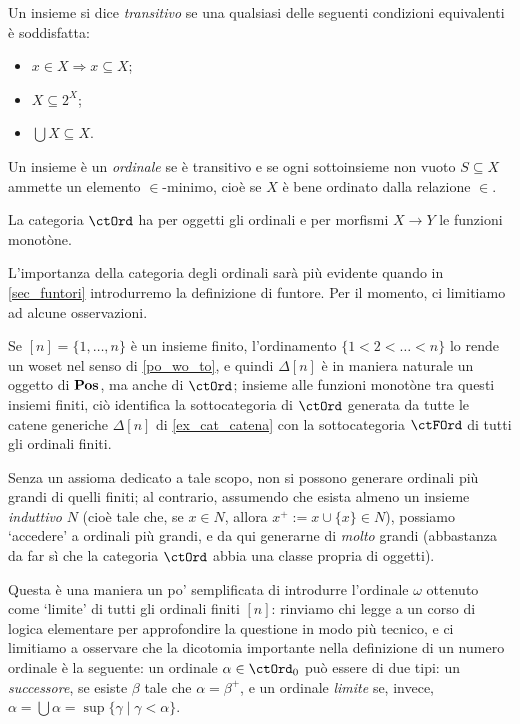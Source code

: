 \begin{example}\label{ex_cat_ordinali}
	Un insieme si dice \emph{transitivo} se una qualsiasi delle seguenti condizioni equivalenti è soddisfatta:
	\begin{itemize}
		\item \(x\in X\Rightarrow x\subseteq X\);
		\item \(X\subseteq 2^X\);
		\item \(\bigcup X\subseteq X\).
	\end{itemize}
	Un insieme è un \emph{ordinale} se è transitivo e se ogni sottoinsieme non vuoto \(S\subseteq X\) ammette un elemento \(\in\)-minimo, cioè se \(X\) è bene ordinato dalla relazione \(\in\).

	La categoria \(\ctOrd\) ha per oggetti gli ordinali e per morfismi \(X\to Y\) le funzioni monotòne.
\end{example}
L'importanza della categoria degli ordinali sarà più evidente quando in \ref{sec_funtori} introdurremo la definizione di funtore. Per il momento, ci limitiamo ad alcune osservazioni.
\begin{remark}
	Se \([n]=\{1,\dots,n\}\) è un insieme finito, l'ordinamento \(\{1<2<\dots<n\}\) lo rende un woset nel senso di \ref{po_wo_to}, e quindi \(\Delta[n]\) è in maniera naturale un oggetto di \(\mathbf{Pos}\), ma anche di \(\ctOrd\); insieme alle funzioni monotòne tra questi insiemi finiti, ciò identifica la sottocategoria di \(\ctOrd\) generata da tutte le catene generiche \(\Delta[n]\) di \ref{ex_cat_catena} con la sottocategoria \(\ctFOrd\) di tutti gli ordinali finiti.
\end{remark}
\begin{remark}
	Senza un assioma dedicato a tale scopo, non si possono generare ordinali più grandi di quelli finiti; al contrario, assumendo che esista almeno un insieme \emph{induttivo} \(N\) (cioè tale che, se \(x\in N\), allora \(x^+:=x\cup\{x\}\in N\)), possiamo `accedere' a ordinali più grandi, e da qui generarne di \emph{molto} grandi (abbastanza da far sì che la categoria \(\ctOrd\) abbia una classe propria di oggetti).

	Questa è una maniera un po' semplificata di introdurre l'ordinale \(\omega\) ottenuto come `limite' di tutti gli ordinali finiti \([n]\): rinviamo chi legge a un corso di logica elementare per approfondire la questione in modo più tecnico, e ci limitiamo a osservare che la dicotomia importante nella definizione di un numero ordinale è la seguente: un ordinale \(\alpha\in\ctOrd_0\) può essere di due tipi: un \emph{successore}, se esiste \(\beta\) tale che \(\alpha=\beta^+\), e un ordinale \emph{limite} se, invece, \(\alpha=\bigcup\alpha=\sup\{\gamma\mid \gamma < \alpha\}\).
\end{remark}
